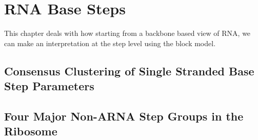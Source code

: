 \chapter{RNA Base Steps}
\label{basesteps} 

This chapter deals with how starting from a backbone based view of
RNA, we can make an interpretation at the step level using the block model.
\section{Consensus Clustering of Single Stranded Base Step Parameters}

\section{Four Major Non-ARNA Step Groups in the Ribosome}



